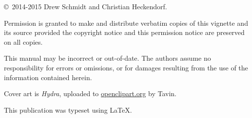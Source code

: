 \null
\vfill
\copyright\ 2014-2015 Drew Schmidt and Christian Heckendorf.

Permission is granted to make and distribute verbatim copies of
this vignette and its source provided the copyright notice and
this permission notice are preserved on all copies.

This manual may be incorrect or out-of-date.  The authors assume
no responsibility for errors or omissions, or for damages resulting
from the use of the information contained herein.

Cover art is \textit{Hydra}, uploaded to \url{openclipart.org} by Tavin.

This publication was typeset using \LaTeX.
